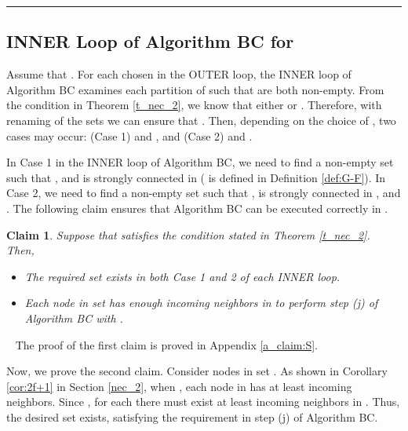 \documentclass[letterpaper, 11pt]{article}
\newenvironment{proof}{\noindent {\bf Proof:}~}{\hspace*{\fill}}
\newtheorem{claim}{Claim}
\begin{document}
\vspace*{4pt}

\hrule


\subsection{INNER Loop of Algorithm BC for }
\label{subsec:inner}
Assume that .
For each  chosen in the OUTER loop, the INNER loop of Algorithm BC examines
each partition  of  such that  are both non-empty.
From the condition in Theorem \ref{t_nec_2}, we know that either
 or .
Therefore, with renaming of the sets we can ensure that 
. Then, depending on the choice of , two cases may occur:
 (Case 1)  and , and (Case 2)  and . 

In Case 1 in the INNER loop of Algorithm BC, we need to find
	a non-empty set  such that ,
	and  is strongly connected in  ( is defined in Definition \ref{def:G-F}).
In Case 2, we need to find
	a non-empty set  such that
	,
	 is strongly connected in , and . 
The following claim ensures that Algorithm BC can be executed correctly in .

\begin{claim}
\label{claim:inner_loop}
Suppose that  satisfies the condition stated in Theorem \ref{t_nec_2}. Then,

\begin{itemize}
\item The required set  exists in both Case 1 and 2 of each INNER loop.

\item Each node in set  has enough incoming neighbors in  to perform step (j) of Algorithm BC with .
\end{itemize}

\end{claim}

\begin{proof}
The proof of the first claim is proved in Appendix \ref{a_claim:S}.

Now, we prove the second claim.
Consider nodes in set . As shown in Corollary \ref{cor:2f+1} in Section \ref{nec_2},
when , each node in  has at least  incoming neighbors.
Since ,
for each  there must exist at least
 incoming neighbors in . 
Thus, the desired set  exists, satisfying
the requirement in step (j) of Algorithm BC.
\end{proof}
\end{document}
